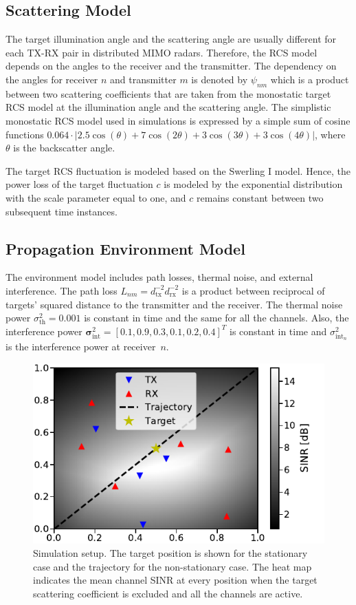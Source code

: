\documentclass[conference]{IEEEtran}
\newcommand{\abs}[1]{\lvert#1\rvert}
\newcommand{\thnoise}{\sigma^2_{\text{th}}}
\newcommand{\eintnoise}{\sigma^2_{\text{int}_{n}}}
\newcommand{\vintnoise}{\boldsymbol{\sigma}^2_{\text{int}}}
\newcommand{\epl}{L_{nm}}
\newcommand{\ercs}{\psi_{nm}}
\begin{document}
\subsection{Scattering Model}
\label{seq:sc_model}

The target illumination angle and the scattering angle are usually different for each TX-RX pair in distributed MIMO radars.
Therefore, the RCS model depends on the angles to the receiver and the transmitter.
The dependency on the angles for receiver $n$ and transmitter $m$ is denoted by $\ercs$ which is a product between two scattering coefficients that are taken from the monostatic target RCS model at the illumination angle and the scattering angle.
The simplistic monostatic RCS model used in simulations is expressed by a simple sum of cosine functions $0.064 \cdot \abs{2.5\cos(\theta) + 7\cos(2\theta) + 3\cos(3\theta) + 3\cos(4\theta)}$, where $\theta$ is the backscatter angle.

The target RCS fluctuation is modeled based on the Swerling I model.
Hence, the power loss of the target fluctuation $c$ is modeled by the exponential distribution with the scale parameter equal to one, and $c$ remains constant between two subsequent time instances.

\subsection{Propagation Environment Model}
\label{seq:env_model}

The environment model includes path losses, thermal noise, and external interference.
The path loss $\epl = d_\text{tx}^{-2} d_\text{rx}^{-2}$ is a product between
reciprocal of targets' squared distance to the transmitter and the receiver.
The thermal noise power $\thnoise=0.001$ is constant in time and the same for all the channels.
Also, the interference power $\vintnoise=[0.1, 0.9, 0.3, 0.1, 0.2, 0.4]^T$ is constant in time and $\eintnoise$ is the interference power at receiver~$n$.

\begin{figure}[!tb]
    \centering
    \includegraphics{figures/env.pdf}
    \caption{Simulation setup.
    The target position is shown for the stationary case and the trajectory for the non-stationary case. 
    The heat map indicates the mean channel SINR at every position when the target scattering coefficient is excluded and all the channels are active.}
    \label{fig:env}
\end{figure}
\end{document}
